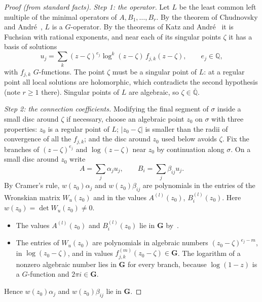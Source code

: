 \documentclass[11pt,a4paper]{article}
\theoremstyle{definition}
\theoremstyle{remark}
\newcommand{\Q}{\mathbb Q}
\newcommand{\Qbar}{\overline{\mathbb Q}}
\newcommand{\bG}{\mathbf G}
\numberwithin{equation}{section}
\begin{document}
\begin{proof}[Proof (from standard facts)]
\emph{Step 1: the operator.} Let $L$ be the least common left multiple of the minimal operators of $A,B_1,\dots,B_r$. By the theorem of Chudnovsky and Andr\'e~\cite{p4:Chu,p4:And}, $L$ is a $G$-operator. By the theorems of Katz and Andr\'e~\cite{p4:And,p4:And00} it is Fuchsian with rational exponents, and near each of its singular points $\zeta$ it has a basis of solutions
\[
u_j=\sum_k(z-\zeta)^{e_j}\log^k(z-\zeta)\,f_{j,k}(z-\zeta),\qquad e_j\in\Q,
\]
with $f_{j,k}$ $G$-functions. The point $\zeta$ must be a singular point of $L$: at a regular point all local solutions are holomorphic, which contradicts the second hypothesis (note $r\ge1$ there). Singular points of $L$ are algebraic, so $\zeta\in\Qbar$.

\emph{Step 2: the connection coefficients.} Modifying the final segment of $\sigma$ inside a small disc around $\zeta$ if necessary, choose an algebraic point $z_0$ on $\sigma$ with three properties: $z_0$ is a regular point of $L$; $|z_0-\zeta|$ is smaller than the radii of convergence of all the $f_{j,k}$; and the disc around $z_0$ used below avoids $\zeta$. Fix the branches of $(z-\zeta)^{e_j}$ and $\log(z-\zeta)$ near $z_0$ by continuation along $\sigma$. On a small disc around $z_0$ write
\[
A=\sum_j\alpha_ju_j,\qquad B_i=\sum_j\beta_{ij}u_j .
\]
By Cramer's rule, $w(z_0)\alpha_j$ and $w(z_0)\beta_{ij}$ are polynomials in the entries of the Wronskian matrix $W_u(z_0)$ and in the values $A^{(l)}(z_0)$, $B_i^{(l)}(z_0)$. Here $w(z_0)=\det W_u(z_0)\ne0$.
\begin{itemize}[leftmargin=1.5em]
\item The values $A^{(l)}(z_0)$ and $B_i^{(l)}(z_0)$ lie in $\bG$ by~\cite[Thm.~1]{p4:FR14}.
\item The entries of $W_u(z_0)$ are polynomials in algebraic numbers $(z_0-\zeta)^{e_j-m}$, in $\log(z_0-\zeta)$, and in values $f_{j,k}^{(m)}(z_0-\zeta)\in\bG$. The logarithm of a nonzero algebraic number lies in $\bG$ for every branch, because $\log(1-z)$ is a $G$-function and $2\pi i\in\bG$.
\end{itemize}
Hence $w(z_0)\alpha_j$ and $w(z_0)\beta_{ij}$ lie in $\bG$.


\end{proof}
\end{document}
